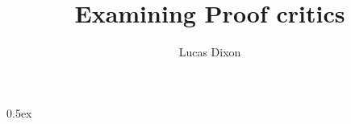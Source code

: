 \documentclass[11pt,a4paper]{article}
\begin{document}
\title{Examining Proof critics}
\author{Lucas Dixon}
\maketitle

\tableofcontents

\parindent 0pt\parskip 0.5ex



%
%
\end{document}
